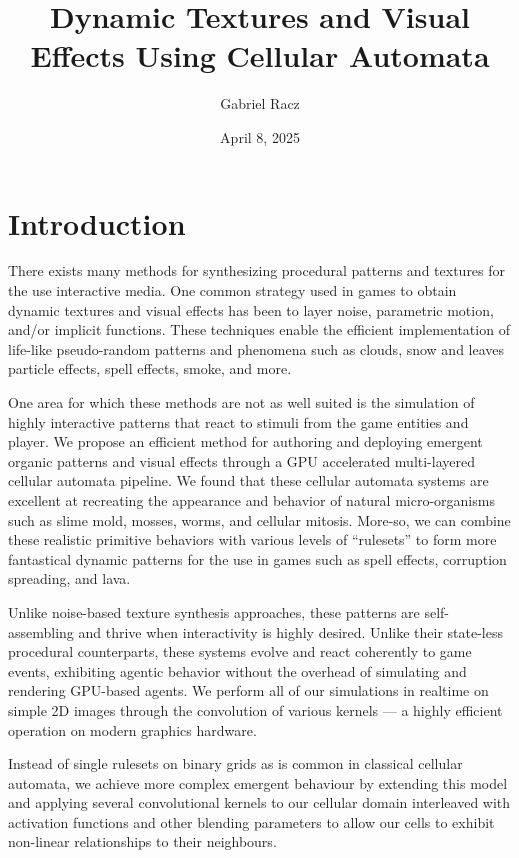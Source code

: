 \documentclass[twocolumn]{article}
\title{Dynamic Textures and Visual Effects Using Cellular Automata}
\author{Gabriel Racz}
\date{April 8, 2025} %
\begin{document}
\maketitle

\section{Introduction}
There exists many methods for synthesizing procedural patterns and textures for the use interactive media.
One common strategy used in games to obtain dynamic textures and visual effects has been to layer noise, parametric motion, and/or implicit functions. These techniques enable the efficient implementation of life-like pseudo-random patterns and phenomena such as clouds, snow and leaves particle effects, spell effects, smoke, and more.

One area for which these methods are not as well suited is the simulation of highly interactive patterns that react to stimuli from the game entities and player. We propose an efficient method for authoring and deploying emergent organic patterns and visual effects through a GPU accelerated multi-layered cellular automata pipeline.
We found that these cellular automata systems are excellent at recreating the appearance and behavior of natural micro-organisms such as slime mold, mosses, worms, and cellular mitosis. More-so, we can combine these realistic primitive behaviors with various levels of ``rulesets'' to form more fantastical dynamic patterns for the use in games such as spell effects, corruption spreading, and lava.

Unlike noise-based texture synthesis approaches, these patterns are self-assembling and thrive when interactivity is highly desired. Unlike their state-less procedural counterparts, these systems evolve and react coherently to game events, exhibiting agentic behavior without the overhead of simulating and rendering GPU-based agents. We perform all of our simulations in realtime on simple 2D images through the convolution of various kernels --- a highly efficient operation on modern graphics hardware.

Instead of single rulesets on binary grids as is common in classical cellular automata, we achieve more complex emergent behaviour by extending this model and applying several convolutional kernels to our cellular domain interleaved with activation functions and other blending parameters to allow our cells to exhibit non-linear relationships to their neighbours.
\end{document}
